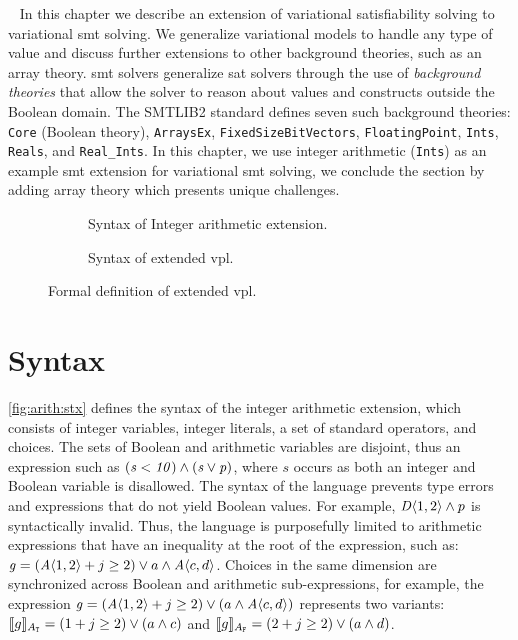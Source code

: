 ~\label{chapter:vsmt}
%
In this chapter we describe an extension of variational satisfiability solving
to variational \ac{smt} solving.
We generalize variational models to handle any type of value and discuss
further extensions to other background theories, such as an array theory.
\ac{smt} solvers generalize \ac{sat} solvers through the use of \emph{background
  theories} that allow the solver to reason about values and constructs outside
the Boolean domain. The SMTLIB2 standard defines seven such background theories:
\texttt{Core} (Boolean theory), \texttt{ArraysEx}, \texttt{FixedSizeBitVectors},
\texttt{FloatingPoint}, \texttt{Ints}, \texttt{Reals}, and \texttt{Real\_Ints}.
In this chapter, we use integer arithmetic (\texttt{Ints}) as an example
\ac{smt} extension for variational \ac{smt} solving, we conclude the section by
adding array theory which presents unique challenges.

\begin{figure}
  \begin{subfigure}[t]{\linewidth}
    \centering
    
    \caption{Syntax of Integer arithmetic extension.}%
    \label{fig:arith:stx}
  \end{subfigure}
  \begin{subfigure}[t]{\linewidth}
    
    \centering
    \caption{Syntax of extended \ac{vpl}.}%
    \label{fig:arith:vpl}
  \end{subfigure}
  \caption{Formal definition of extended \ac{vpl}.}%
  \label{fig:ex:vpl}
\end{figure}

\section{Syntax}
%
\autoref{fig:arith:stx} defines the syntax of the integer arithmetic extension,
which consists of integer variables, integer literals, a set of standard
operators, and choices.
%
The sets of Boolean and arithmetic variables are disjoint, thus an expression
such as $(\mathit{s < 10) \wedge (s \vee p})$, where $s$ occurs as both an integer
and Boolean variable is disallowed.
%
The syntax of the language prevents type errors and expressions that do not
yield Boolean values. For example, $\chc[D]{1,2} \wedge p$ is syntactically
invalid.
%
Thus, the language is purposefully limited to arithmetic expressions that
have an inequality at the root of the expression, such as: $\kf{g} =
(\chc[A]{1, 2} + j \geq 2) \vee a \wedge \chc[A]{c, d}$.
%
Choices in the same dimension are synchronized across Boolean and arithmetic
sub-expressions, for example, the expression
%
$\kf{g} = (\chc[A]{1, 2} + j \geq 2) \vee (a \wedge \chc[A]{c,d})$
represents two variants:
%
$\sem[A_{\tru{}}]{g} = (1 + j \geq 2) \vee (a \wedge c)$ and
$\sem[A_{\fls{}}]{g} = (2 + j \geq 2) \vee (a \wedge d)$.

